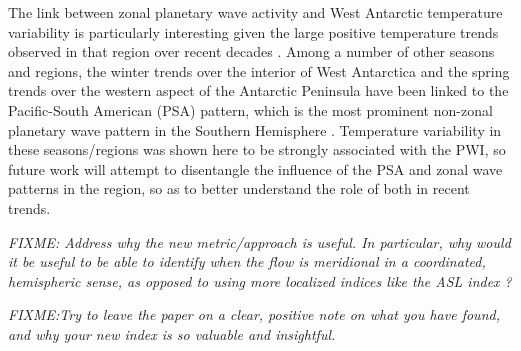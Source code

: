 The link between zonal planetary wave activity and West Antarctic temperature variability is particularly interesting given the large positive temperature trends observed in that region over recent decades \citep[e.g.][]{Bromwich2013}. Among a number of other seasons and regions, the winter trends over the interior of West Antarctica \citep{Ding2011} and the spring trends over the western aspect of the Antarctic Peninsula \citep{Ding2013} have been linked to the Pacific-South American (PSA) pattern, which is the most prominent non-zonal planetary wave pattern in the Southern Hemisphere \citep[e.g.][]{Mo2001}. Temperature variability in these seasons/regions was shown here to be strongly associated with the PWI, so future work will attempt to disentangle the influence of the PSA and zonal wave patterns in the region, so as to better understand the role of both in recent trends.   

\textit{FIXME: Address why the new metric/approach is useful. In particular, why would it be useful to be able to identify when the flow is meridional in a coordinated, hemispheric sense, as opposed to using more localized indices like the ASL index \citep{Turner2013}?}

\textit{FIXME:Try to leave the paper on a clear, positive note on what you have found, and why your new index is so valuable and insightful.}
